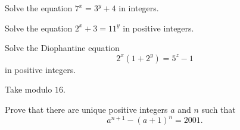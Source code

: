 \documentclass{subfile}
\begin{document}
	\begin{problem} %
		Solve the equation $7^x=3^y+4$ in integers.
	\end{problem}

	\begin{problem} %
		 Solve the equation $2^x+3=11^y$ in positive integers.
	\end{problem}

	\begin{problem} %
		Solve the Diophantine equation $$2^x(1+2^y)=5^z-1$$ in positive integers.
	\end{problem}

	\begin{hint}
		Take modulo $16$.
	\end{hint}

	\begin{problem}[Putnam 2001] %
		Prove that there are unique positive integers $a$ and $n$ such that $$a^{n+1}-(a+1)^n=2001.$$
	\end{problem}
\end{document}
